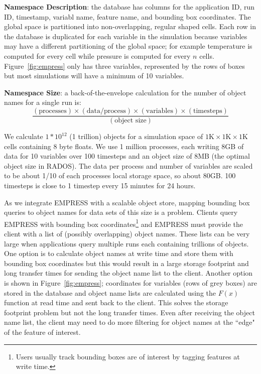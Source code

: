 \textbf{Namespace Description}: the database has columns for the application
ID, run ID, timestamp, variabl name, feature name, and bounding box
coordinates.  The global space is partitioned into non-overlapping, regular
shaped cells.  Each row in the database is duplicated for each variable in the
simulation because variables may have a different partitioning of the global
space; for example temperature is computed for every cell while pressure is
computed for every \(n\) cells.  Figure~\ref{fig:empress} only has three
variables, represented by the rows of boxes but most simulations will have a
minimum of 10 variables.

\textbf{Namespace Size}: a back-of-the-envelope calculation for the number of
object names for a single run is:
\vspace{-0.5em}
\[\frac
  {(\text{processes})\times
   (\text{data/process})\times
   (\text{variables})\times
   (\text{timesteps})}
  {(\text{object size})}
\]
\vspace{-0.5em}

We calculate \(1*10^{12}\) (1 trillion) objects for a simulation space of
\(1\text{K}\times1\text{K}\times1\text{K}\) cells containing 8 byte floats.  We
use 1 million processes, each writing 8GB of data for 10 variables over 100
timesteps and an object size of 8MB (the optimal object size in RADOS).
The data per process and number of variables are scaled to be about
1/10 of each processes local storage space, so about 80GB. 100 timesteps is
close to 1 timestep every 15 minutes for 24 hours. 

As we integrate EMPRESS with a scalable object store, mapping bounding box
queries to object names for data sets of this size is a problem. Clients query
EMPRESS with bounding box coordinates\footnote{Users usually track bounding
boxes are of interest by tagging features at write time.} and EMPRESS must
provide the client with a list of (possibly overlapping) object names.  These
lists can be very large when applications query multiple runs each containing
trillions of objects.  One option is to calculate object names at write time
and store them with bounding box coordinates but this would result in a large
storage footprint and long transfer times for sending the object name list to
the client.  Another option is shown in Figure~\ref{fig:empress}; coordinates
for variables (rows of grey boxes) are stored in the database and object name
lists are calculated using the \(F(x)\) function at read time and sent back to
the client. This solves the storage footprint problem but not the long transfer
times.  Even after receiving the object name list, the client may need to do
more filtering for object names at the ``edge" of the feature of interest.


